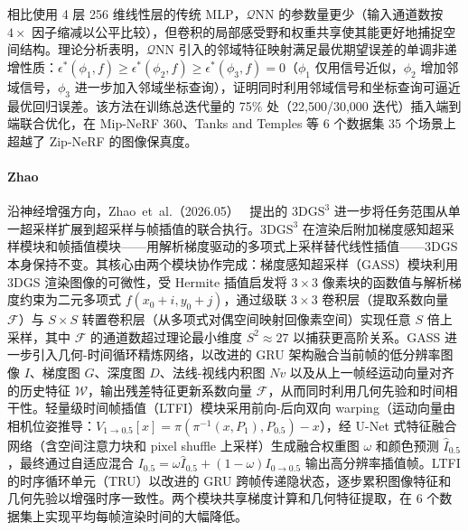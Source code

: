 相比使用 4 层 256 维线性层的传统 MLP，$\mathcal{Q}$NN 的参数量更少（输入通道数按 $4\times$ 因子缩减以公平比较），但卷积的局部感受野和权重共享使其能更好地捕捉空间结构。理论分析表明，$\mathcal{Q}$NN 引入的邻域特征映射满足最优期望误差的单调非递增性质：$\epsilon^*(\phi_1, f) \geq \epsilon^*(\phi_2, f) \geq \epsilon^*(\phi_3, f) = 0$（$\phi_1$ 仅用信号近似，$\phi_2$ 增加邻域信号，$\phi_3$ 进一步加入邻域坐标查询），证明同时利用邻域信号和坐标查询可逼近最优回归误差。该方法在训练总迭代量的 75\% 处（22{,}500/30{,}000 迭代）插入端到端联合优化，在 Mip-NeRF 360、Tanks and Temples 等 6 个数据集 35 个场景上超越了 Zip-NeRF 的图像保真度。

\paragraph{Zhao}
沿神经增强方向，Zhao~et~al.（2026.05）~\cite{2605_11489} 提出的 $3\text{DGS}^3$ 进一步将任务范围从单一超采样扩展到超采样与帧插值的联合执行。$3\text{DGS}^3$ 在渲染后附加梯度感知超采样模块和帧插值模块——用解析梯度驱动的多项式上采样替代线性插值——3DGS 本身保持不变。其核心由两个模块协作完成：梯度感知超采样（GASS）模块利用 3DGS 渲染图像的可微性，受 Hermite 插值启发将 $3{\times}3$ 像素块的函数值与解析梯度约束为二元多项式 $f(x_0{+}i, y_0{+}j)$，通过级联 $3{\times}3$ 卷积层（提取系数向量 $\mathcal{F}$）与 $S{\times}S$ 转置卷积层（从多项式对偶空间映射回像素空间）实现任意 $S$ 倍上采样，其中 $\mathcal{F}$ 的通道数超过理论最小维度 $S^2 \approx 27$ 以捕获更高阶关系。GASS 进一步引入几何-时间循环精炼网络，以改进的 GRU 架构融合当前帧的低分辨率图像 $I$、梯度图 $G$、深度图 $D$、法线-视线内积图 $Nv$ 以及从上一帧经运动向量对齐的历史特征 $\mathcal{W}$，输出残差特征更新系数向量 $\mathcal{F}$，从而同时利用几何先验和时间相干性。轻量级时间帧插值（LTFI）模块采用前向-后向双向 warping（运动向量由相机位姿推导：$V_{1\to 0.5}[x] = \pi(\pi^{-1}(x, P_1), P_{0.5}) - x$），经 U-Net 式特征融合网络（含空间注意力块和 pixel shuffle 上采样）生成融合权重图 $\omega$ 和颜色预测 $\hat{I}_{0.5}$，最终通过自适应混合 $I_{0.5} = \omega \hat{I}_{0.5} + (1{-}\omega) I_{0\to 0.5}$ 输出高分辨率插值帧。LTFI 的时序循环单元（TRU）以改进的 GRU 跨帧传递隐状态，逐步累积图像特征和几何先验以增强时序一致性。两个模块共享梯度计算和几何特征提取，在 6 个数据集上实现平均每帧渲染时间的大幅降低。

